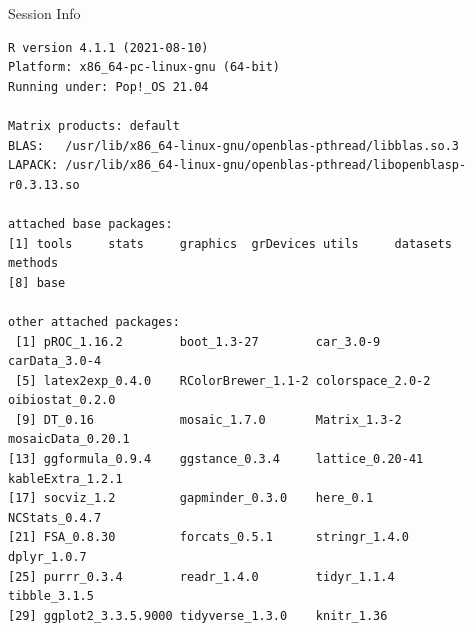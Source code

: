 \documentclass[10pt,handout]{beamer}\usepackage[]{graphicx}\usepackage[]{color}
\makeatletter
\newenvironment{kframe}{%
 \def\at@end@of@kframe{}%
 \ifinner\ifhmode%
  \def\at@end@of@kframe{\end{minipage}}%
  \begin{minipage}{\columnwidth}%
 \fi\fi%
 \def\FrameCommand##1{\hskip\@totalleftmargin \hskip-\fboxsep
 \colorbox{shadecolor}{##1}\hskip-\fboxsep
     \hskip-\linewidth \hskip-\@totalleftmargin \hskip\columnwidth}%
 \MakeFramed {\advance\hsize-\width
   \@totalleftmargin\z@ \linewidth\hsize
   \@setminipage}}%
 {\par\unskip\endMakeFramed%
 \at@end@of@kframe}
\newenvironment{knitrout}{}{} %
\makeatother
\begin{document}
\begin{frame}[fragile]{Session Info}
	\tiny
	
\begin{knitrout}\tiny
{}\color{fgcolor}\begin{kframe}
\begin{verbatim}
R version 4.1.1 (2021-08-10)
Platform: x86_64-pc-linux-gnu (64-bit)
Running under: Pop!_OS 21.04

Matrix products: default
BLAS:   /usr/lib/x86_64-linux-gnu/openblas-pthread/libblas.so.3
LAPACK: /usr/lib/x86_64-linux-gnu/openblas-pthread/libopenblasp-r0.3.13.so

attached base packages:
[1] tools     stats     graphics  grDevices utils     datasets  methods  
[8] base     

other attached packages:
 [1] pROC_1.16.2        boot_1.3-27        car_3.0-9          carData_3.0-4     
 [5] latex2exp_0.4.0    RColorBrewer_1.1-2 colorspace_2.0-2   oibiostat_0.2.0   
 [9] DT_0.16            mosaic_1.7.0       Matrix_1.3-2       mosaicData_0.20.1 
[13] ggformula_0.9.4    ggstance_0.3.4     lattice_0.20-41    kableExtra_1.2.1  
[17] socviz_1.2         gapminder_0.3.0    here_0.1           NCStats_0.4.7     
[21] FSA_0.8.30         forcats_0.5.1      stringr_1.4.0      dplyr_1.0.7       
[25] purrr_0.3.4        readr_1.4.0        tidyr_1.1.4        tibble_3.1.5      
[29] ggplot2_3.3.5.9000 tidyverse_1.3.0    knitr_1.36        


\end{verbatim}
\end{kframe}
\end{knitrout}
\end{frame}
\end{document}
